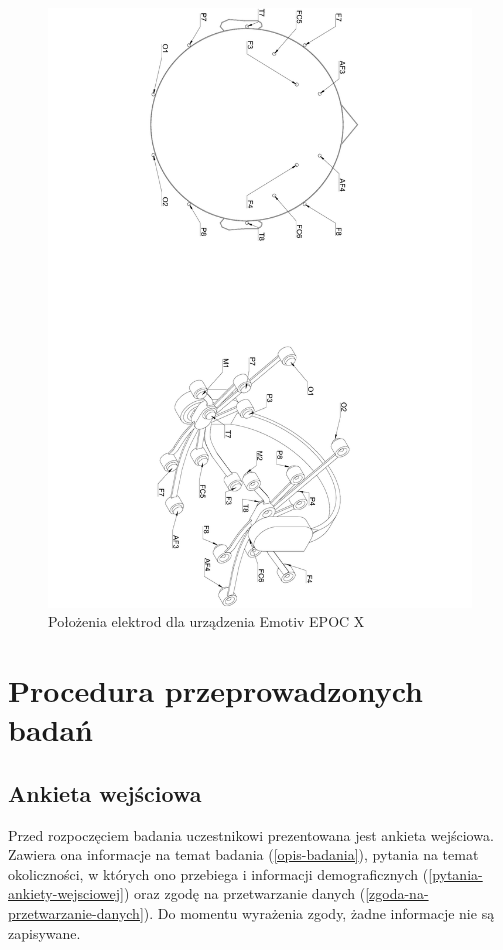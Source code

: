 \documentclass{./assets/wfis}
\begin{document}
\begin{figure}[h!]
    \centering
    \includegraphics[angle=90,trim={35cm 0 8cm 0},origin=c,width=\columnwidth]{./assets/yas6.pdf}
    \caption{Położenia elektrod dla urządzenia Emotiv EPOC X}
    \label{fig:emotiv-electrode-locations}
\end{figure}


\section{Procedura przeprowadzonych badań}\label{procedura-badan}
\subsection{Ankieta wejściowa}
Przed rozpoczęciem badania uczestnikowi prezentowana jest ankieta wejściowa. Zawiera ona informacje na temat badania (\autoref{opis-badania}), pytania na temat okoliczności, w których ono przebiega i informacji demograficznych (\autoref{pytania-ankiety-wejsciowej}) oraz zgodę na przetwarzanie danych (\autoref{zgoda-na-przetwarzanie-danych}). Do momentu wyrażenia zgody, żadne informacje nie są zapisywane.
\end{document}
